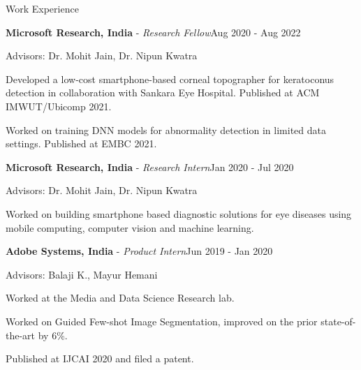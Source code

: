 \documentclass{resume} %
\begin{document}

\begin{rSection}{Work Experience} \itemsep -2pt

\begin{rSubsection}{\textbf{Microsoft Research, India} - \textit{Research Fellow}}{Aug 2020 - Aug 2022}{}{}
\begin{small}
\item Advisors: Dr. Mohit Jain, Dr. Nipun Kwatra
\item Developed a low-cost smartphone-based corneal topographer for keratoconus detection in collaboration with Sankara Eye Hospital. Published at ACM IMWUT/Ubicomp 2021.
\item Worked on training DNN models for abnormality detection in limited data settings. Published at EMBC 2021.
\end{small}
\end{rSubsection}

\vspace{-3pt}
\begin{rSubsection}{\textbf{Microsoft Research, India} - \textit{Research Intern}}{Jan 2020 - Jul 2020}{}{}
\begin{small}
\item Advisors: Dr. Mohit Jain, Dr. Nipun Kwatra
\item Worked on building smartphone based diagnostic solutions for eye diseases using mobile computing, computer vision and machine learning.
\end{small}
\end{rSubsection}

\vspace{-3pt}
\begin{rSubsection}{\textbf{Adobe Systems, India} - \textit{Product Intern}}{Jun 2019 - Jan 2020}{}{}
\begin{small}
\item Advisors: Balaji K., Mayur Hemani
\item Worked at the Media and Data Science Research lab.
\item Worked on Guided Few-shot Image Segmentation, improved on the prior state-of-the-art by 6\%. 
\item Published at IJCAI 2020 and filed a patent.
\end{small}
\end{rSubsection}


\end{rSection}
\end{document}
